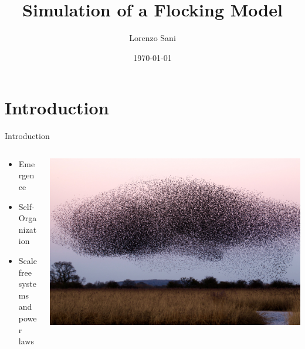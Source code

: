 \documentclass{beamer}
\title[Simple Flocking]{Simulation of a Flocking Model}
\author{Lorenzo Sani}
\institute{Università degli Studi di Bologna}
\date{\today}
\begin{document}
\begin{frame}
  \titlepage
\end{frame}


\section{Introduction}

\begin{frame}{Introduction}
\begin{minipage}[0.95\textheight]{\textwidth}
\begin{columns}[T]
\begin{column}{0.30\textwidth}
\begin{itemize}
  \item Emergence
  \vspace{0.5cm}
  \item Self-Organization
  \vspace{0.5cm}
  \item Scale free systems\\ and power laws
\end{itemize}
\end{column}
\begin{column}{0.65\textwidth}
\includegraphics[width=\textwidth, keepaspectratio]{images/flock_image.jpeg}
\end{column}
\end{columns}
\end{minipage}
\end{frame}
\end{document}

